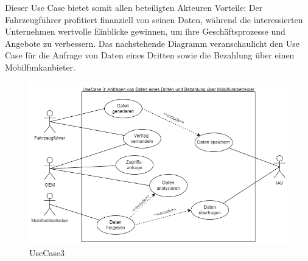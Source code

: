 \newline
Dieser Use Case bietet somit allen beteiligten Akteuren Vorteile: Der Fahrzeugführer profitiert finanziell von seinen Daten, während die interessierten Unternehmen wertvolle Einblicke gewinnen, um ihre Geschäftsprozesse und Angebote zu verbessern.
\newline
Das nachstehende Diagramm veranschaulicht den Use Case für die Anfrage von Daten eines Dritten sowie die Bezahlung über einen Mobilfunkanbieter.
\begin{figure}[H]
    \centering
    \includegraphics[scale=.6]{media/UseCase3}
    \caption{UseCase3}
    \label{fig:UseCase3}
  \end{figure}
\label{chap:kapitel4}
